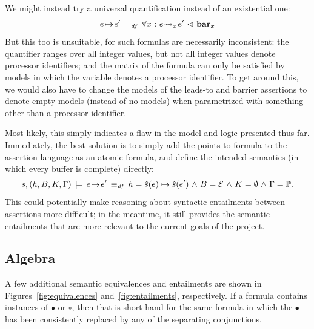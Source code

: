\documentclass[11pt]{report}
\begin{document}
We might instead try a universal quantification instead of an existential one: \[e \!\mapsto\! e' \operatorname{\;=_{\mathit{df}}\;} \forall x \operatorname{\,:\,} e \!\leadsto_{x}\! e' \operatorname{\,\vartriangleleft\,} \mathbf{bar}_{x} \] But this too is unsuitable, for such formulas are necessarily inconsistent: the quantifier ranges over all integer values, but not all integer values denote processor identifiers; and the matrix of the formula can only be satisfied by models in which the variable denotes a processor identifier. To get around this, we would also have to change the models of the leads-to and barrier assertions to denote empty models (instead of no models) when parametrized with something other than a processor identifier. 

Most likely, this simply indicates a flaw in the model and logic presented thus far. Immediately, the best solution is to simply add the points-to formula to the assertion language as an atomic formula, and define the intended semantics (in which every buffer is complete) directly: \[ s,(h,B,K,\Gamma) \,\models\, e \!\mapsto\! e' \operatorname{\;\equiv_{\mathit{df}}\;} h = \hat{s}(e) \mapsto \hat{s}(e') \operatorname{\,\wedge\,} B = \mathcal{E} \operatorname{\,\wedge\,} K = \operatorname{\emptyset} \operatorname{\,\wedge\,} \Gamma = \mathbb{P}.\] This could potentially make reasoning about syntactic entailments between assertions more difficult; in the meantime, it still provides the semantic entailments that are more relevant to the current goals of the project. 

\subsection{Algebra}
\label{sec:algebra}

A few additional semantic equivalences and entailments are shown in Figures~\ref{fig:equivalences} and~\ref{fig:entailments}, respectively. If a formula contains instances of $\bullet$ or $\circ$, then that is short-hand for the same formula in which the $\bullet$ has been consistently replaced by any of the separating conjunctions. 
\end{document}
